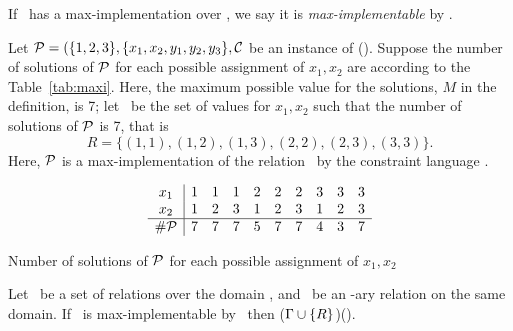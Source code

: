 If \mR\ has a max-implementation over \mrelset, we say it is \emph{max-implementable} by \mrelset\@.

\begin{example}
Let \(\mathcal{P} = (\{1,2,3\}, \{x_1,x_2,y_1,y_2,y_3\}, \mathcal{C}\) be an instance
of \ccsp(\mrelset)\@. Suppose the number of solutions of \(\mathcal{P}\) for each possible
assignment of \(x_1, x_2\) are according to the Table~\ref{tab:maxi}\@.
Here, the maximum possible value for the solutions, \(M\) in the definition, is 7;
let \mR\ be the set of values for \(x_1,x_2\) such that
the number of solutions of \(\mathcal{P}\) is 7, that is 
\[R = \{(1,1), (1,2), (1,3), (2,2), (2,3), (3,3)\}.\]
Here, \(\mathcal{P}\) is a max-implementation of the relation \mR\ by the constraint language 
\mrelset\@.
\begin{table}
\begin{eqnarray*}
\begin{array}{c|ccccccccc}
x_1 & 1 & 1 & 1 & 2 & 2 & 2 & 3 & 3 & 3\\
x_2 & 1 & 2 & 3 & 1 & 2 & 3 & 1 & 2 & 3\\
\hline
\#\mathcal{P} & 7 & 7 & 7 & 5 & 7 & 7 & 4 & 3 & 7\\ 
\end{array}
\end{eqnarray*}
\caption{Number of solutions of \ensuremath{\probi} for each possible assignment of \ensuremath{x_1,x_2}}\label{tab:maxi}
\end{table}
\end{example}


\begin{theorem}[Maximization]\label{theo:max}
Let \mrelset\ be a set of relations over the domain \mD,
and \mR\ be an \mn-ary relation on the same domain. 
If \mR\ is max-implementable by \mrelset\ then \ccsp(\(\Gamma \cup \{{R}\}\))\maple\ccsp(\mrelset)\@.
\end{theorem}

